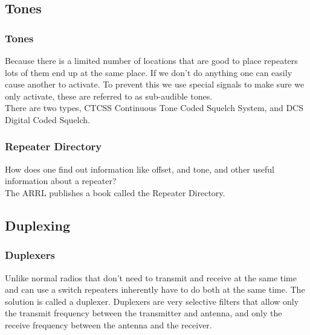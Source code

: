 \documentclass[10pt]{beamer}
\begin{document}
\subsection{Tones}

\begin{frame}
\frametitle{Tones}
Because there is a limited number of locations that are good to place repeaters lots of them end up at the same place. If we don't do anything one can easily cause another to activate. To prevent this we use special signals to make sure we only activate, these are referred to as sub-audible tones.\\

There are two types, CTCSS Continuous Tone Coded Squelch System, and DCS Digital Coded Squelch.
\end{frame}

\begin{frame}
\frametitle{Repeater Directory}
How does one find out information like offset, and tone, and other useful information about a repeater?\\
The ARRL publishes a book called the Repeater Directory.
\end{frame}

\subsection{Duplexing}

\begin{frame}
\frametitle{Duplexers}
Unlike normal radios that don't need to transmit and receive at the same time and can use a switch repeaters inherently have to do both at the same time. The solution is called a duplexer. Duplexers are very selective filters that allow only the transmit frequency between the transmitter and antenna, and only the receive frequency between the antenna and the receiver.
\end{frame}
\end{document}
